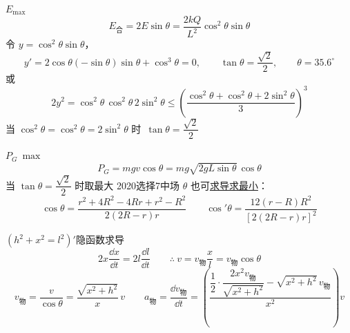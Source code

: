 
$E_{\max}$
\[
E_{\text{合}}=2E\sin\theta=\frac{2kQ}{L^{2}}\cos^{2}\theta\sin\theta
\]
令 $y=\cos^{2}\theta\sin\theta$，
\[
y'=2\cos\theta(-\sin\theta)\sin\theta+\cos^{3}\theta=0,\qquad
\tan\theta=\frac{\sqrt{2}}{2},\qquad \theta=35.6^\circ
\]
或\quad
\[
2y^{2}=\cos^{2}\theta\,\cos^{2}\theta\,2\sin^{2}\theta\le\left(\frac{\cos^{2}\theta+\cos^{2}\theta+2\sin^{2}\theta}{3}\right)^{3}
\]
当 $\cos^{2}\theta=\cos^{2}\theta=2\sin^{2}\theta$ 时\ $\tan\theta=\dfrac{\sqrt{2}}{2}$

$P_{G}\ \max$
\[
P_{G}=mgv\cos\theta=mg\sqrt{2gL\sin\theta}\,\cos\theta
\]
当 $\tan\theta=\dfrac{\sqrt{2}}{2}$ 时取最大
2020选择7中场 $\theta$ 也可\underline{求导求最小}：
\[
\cos\theta=\frac{r^{2}+4R^{2}-4Rr+r^{2}-R^{2}}{2(2R-r)r}\qquad
\cos'\theta=\frac{12(r-R)R^{2}}{[2(2R-r)r]^{2}}
\]

$(h^{2}+x^{2}=l^{2})'$\quad 隐函数求导
\[
2x\frac{\dd x}{\dd t}=2l\frac{\dd l}{\dd t}\qquad \therefore\ v=v_{\text{物}}\frac{x}{l}=v_{\text{物}}\cos\theta
\]
\[
v_{\text{物}}=\frac{v}{\cos\theta}=\frac{\sqrt{x^{2}+h^{2}}}{x}\,v
\qquad
a_{\text{物}}=\frac{\dd v_{\text{物}}}{\dd t}=\left(\frac{\dfrac{1}{2}\cdot\dfrac{2x^{2}v_{\text{物}}}{\sqrt{x^{2}+h^{2}}}-\sqrt{x^{2}+h^{2}}\,v_{\text{物}}}{x^{2}}\right)v
\]

